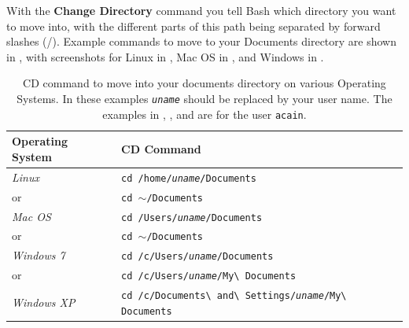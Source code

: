 With the \textbf{Change Directory} command you tell Bash which directory you want to move into, with the different parts of this path being separated by forward slashes (/). Example commands to move to your Documents directory are shown in , with screenshots for Linux in , Mac OS in , and Windows in .

\begin{table}[h]
  \centering
  \begin{tabular}{|l|l|}
  \hline
  \textbf{Operating System} & \textbf{CD Command}  \\
  \hline
  \emph{Linux} & \texttt{cd /home/\emph{uname}/Documents} \\
  or & \texttt{cd $\sim$/Documents} \\
  \hline
  \emph{Mac OS} & \texttt{cd /Users/\emph{uname}/Documents} \\
  or & \texttt{cd $\sim$/Documents} \\
  \hline
  \emph{Windows 7} & \texttt{cd /c/Users/\emph{uname}/Documents} \\
  or & \texttt{cd /c/Users/\emph{uname}/My{\textbackslash} Documents} \\
  \hline
  \emph{Windows XP} & \texttt{cd /c/Documents{\textbackslash} and{\textbackslash} Settings/\emph{uname}/My{\textbackslash} Documents} \\
  \hline
\end{tabular}
  \caption{CD command to move into your documents directory on various Operating Systems. In these examples \texttt{\emph{uname}} should be replaced by your user name. The examples in , , and  are for the user \texttt{acain}.}
  \label{tbl:dirs}
\end{table}


